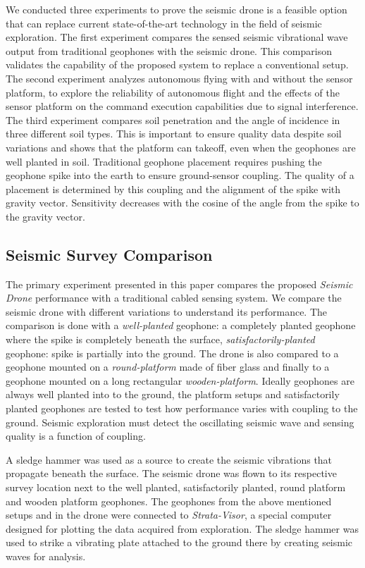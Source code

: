 We conducted three experiments to prove the seismic drone is a feasible option that can replace current state-of-the-art technology in the field of seismic exploration. The first experiment compares the sensed seismic vibrational wave output from traditional geophones with the seismic drone. This comparison validates the capability  of the proposed system to replace a conventional setup. The second experiment analyzes autonomous flying with and without the sensor platform, to explore the reliability of autonomous flight and the effects of the sensor platform on the command execution capabilities due to signal interference. The third experiment compares soil penetration and the angle of incidence in three different soil types. This is important to ensure quality data despite soil variations and shows that the platform can takeoff, even when the geophones are well planted in soil. Traditional geophone placement requires pushing the geophone spike into the earth to ensure ground-sensor coupling. The quality of a placement is determined by this coupling and the alignment of the spike with gravity vector. Sensitivity decreases with the cosine of the angle from the spike to the gravity vector.

\subsection{Seismic Survey Comparison}

The primary experiment presented in this paper compares the proposed \emph{Seismic Drone} performance with a traditional cabled sensing system. We compare the seismic drone with different variations to understand its performance. The comparison is done with a \emph{well-planted} geophone: a completely planted geophone where the spike is completely beneath the surface, \emph{satisfactorily-planted} geophone: spike is partially into the ground. The drone is also compared to a geophone mounted on a \emph{round-platform} made of fiber glass and finally to a geophone mounted on a long rectangular \emph{wooden-platform}. Ideally geophones are always well planted into to the ground, the platform setups and satisfactorily planted geophones are tested to test how performance varies with coupling to the ground. Seismic exploration must detect the oscillating seismic wave and sensing quality is a function of coupling. 

A sledge hammer was used as a source to create the seismic vibrations that propagate beneath the surface. The seismic drone was flown to its respective survey location next to the well planted, satisfactorily planted, round platform and wooden platform geophones. The geophones from the above mentioned setups and in the drone were connected to \emph{Strata-Visor}, a special computer designed for plotting the data acquired from exploration. The sledge hammer was used to strike a vibrating plate attached to the ground there by creating seismic waves for analysis.

